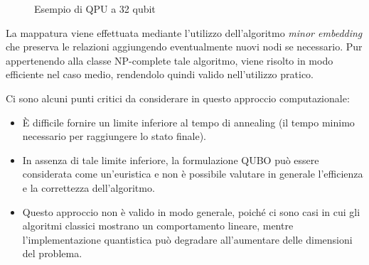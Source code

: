 \documentclass{article}
\begin{document}
\begin{figure}
\begin{center}
    \caption{Esempio di QPU a 32 qubit\cite{MCGEOCH2020169}}
\end{center}
\end{figure}

La mappatura viene effettuata mediante l'utilizzo dell'algoritmo \emph{minor embedding} che preserva le relazioni aggiungendo eventualmente nuovi nodi se necessario. Pur appertenendo alla classe NP-complete tale algoritmo, viene risolto in modo efficiente nel caso medio, rendendolo quindi valido nell'utilizzo pratico.

Ci sono alcuni punti critici da considerare in questo approccio computazionale:

\begin{itemize}
    \item È difficile fornire un limite inferiore al tempo di annealing (il tempo minimo necessario per raggiungere lo stato finale).
    \item In assenza di tale limite inferiore, la formulazione QUBO può essere considerata come un'euristica e non è possibile valutare in generale l'efficienza e la correttezza dell'algoritmo.
    \item Questo approccio non è valido in modo generale, poiché ci sono casi in cui gli algoritmi classici mostrano un comportamento lineare, mentre l'implementazione quantistica può degradare all'aumentare delle dimensioni del problema.
\end{itemize}
\pagebreak
\end{document}
